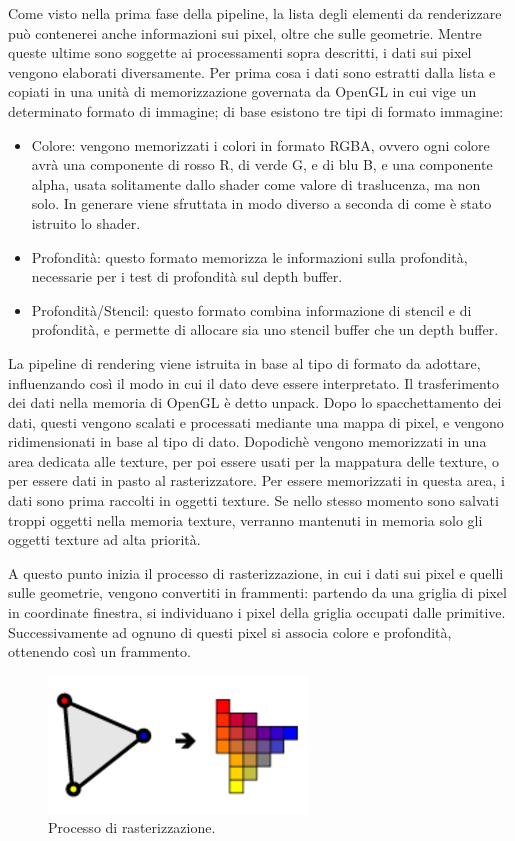 Come visto nella prima fase della pipeline, la lista degli elementi da renderizzare può contenerei anche informazioni sui pixel, oltre che sulle geometrie. Mentre queste ultime sono soggette ai processamenti sopra descritti, i dati sui pixel vengono elaborati diversamente.
Per prima cosa i dati sono estratti dalla lista e copiati in una unità di memorizzazione governata da OpenGL in cui vige un determinato formato di immagine; di base esistono tre tipi di formato immagine:
\begin{itemize}
\item Colore: vengono memorizzati i colori in formato RGBA, ovvero ogni colore avrà una componente di rosso R, di verde G, e di blu B, e una componente alpha, usata solitamente dallo shader come valore di traslucenza, ma non solo. In generare viene sfruttata in modo diverso a seconda di come è stato istruito lo shader.
\item Profondità: questo formato memorizza le informazioni sulla profondità, necessarie  per i test di profondità sul depth buffer.
\item Profondità/Stencil: questo formato combina informazione di stencil e di profondità, e permette di allocare sia uno stencil buffer che un depth buffer.
\end{itemize}
La pipeline di rendering viene istruita in base al tipo di formato da adottare, influenzando così il modo in cui il dato deve essere interpretato.
Il trasferimento dei dati nella memoria di OpenGL è detto unpack.
Dopo lo spacchettamento dei dati, questi vengono scalati e processati mediante una mappa di pixel, e vengono ridimensionati in base al tipo di dato. Dopodichè vengono memorizzati in una area dedicata alle texture, per poi essere usati per la mappatura delle texture, o per essere dati in pasto al rasterizzatore. 
Per essere memorizzati in questa area, i dati sono prima raccolti in oggetti texture. Se nello stesso momento sono salvati troppi oggetti nella memoria texture, verranno mantenuti in memoria solo  gli oggetti texture ad alta priorità. 

A questo punto inizia il processo di rasterizzazione, in cui i dati sui pixel e quelli sulle geometrie, vengono convertiti in frammenti: partendo da una griglia di pixel in coordinate finestra, si individuano i pixel della griglia occupati dalle primitive. Successivamente ad ognuno di questi pixel si associa colore e profondità, ottenendo così un frammento. 
\\
\begin{figure}[htb]
 \centering
 \includegraphics[width=0.4\linewidth]{images/chapter_stato_arte/stato_arte_raster.png}\hfill
 \caption[Rasterizzazione OpenGL]{Processo di rasterizzazione.}
 \label{fig:stato_arte_raster}
\end{figure}

